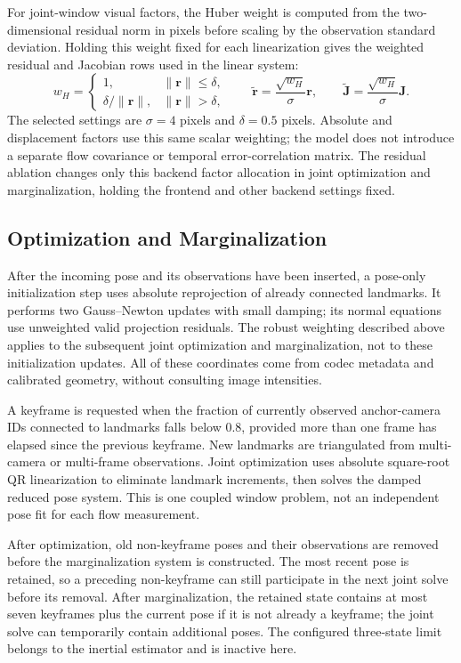For joint-window visual factors, the Huber weight is computed from the
two-dimensional residual norm in pixels before scaling by the observation
standard deviation. Holding this weight fixed for each linearization gives
the weighted residual and Jacobian rows used in the linear system:
\begin{equation}
  w_H =
  \begin{cases}
    1, & \|\mathbf r\|\leq\delta,\\
    \delta/\|\mathbf r\|, & \|\mathbf r\|>\delta,
  \end{cases}
  \qquad
  \widetilde{\mathbf r}=\frac{\sqrt{w_H}}{\sigma}\mathbf r,
  \qquad
  \widetilde{\mathbf J}=\frac{\sqrt{w_H}}{\sigma}\mathbf J .
\end{equation}
The selected settings are $\sigma=4$ pixels and $\delta=0.5$ pixels. Absolute
and displacement factors use this same scalar weighting; the model does not
introduce a separate flow covariance or temporal error-correlation matrix.
The residual ablation changes only this backend factor allocation in joint
optimization and marginalization,
holding the frontend and other backend settings fixed.

\subsection{Optimization and Marginalization}

After the incoming pose and its observations have been inserted, a pose-only
initialization step uses absolute reprojection of already connected landmarks.
It performs two Gauss--Newton updates with small damping; its normal equations
use unweighted valid projection residuals. The robust weighting described above
applies to the subsequent joint optimization and marginalization, not to these
initialization updates. All of these coordinates come from codec metadata and
calibrated geometry, without consulting image intensities.

A keyframe is requested when the fraction of currently observed anchor-camera
IDs connected to landmarks falls below $0.8$, provided more than one frame has elapsed since
the previous keyframe. New landmarks are triangulated from multi-camera or
multi-frame observations. Joint optimization uses absolute square-root QR
linearization to eliminate landmark increments, then solves the damped reduced
pose system. This is one coupled window problem, not an independent pose fit
for each flow measurement.

After optimization, old non-keyframe poses and their observations are removed
before the marginalization system is constructed. The most recent pose is
retained, so a preceding non-keyframe can still participate in the next joint
solve before its removal. After marginalization, the retained state contains
at most seven keyframes plus the current pose if it is not already a keyframe;
the joint solve can temporarily contain additional poses. The configured
three-state limit belongs to the inertial estimator and is inactive here.

